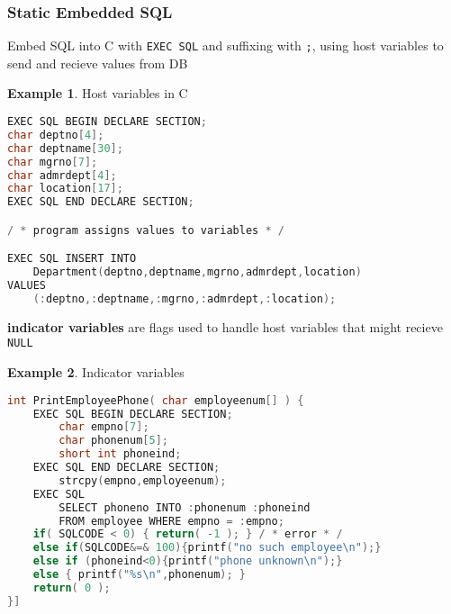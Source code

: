 \documentclass[]{article}
\theoremstyle{definition}
\newtheorem{ex}{Example}[section]
\begin{document}
			\subsubsection{Static Embedded SQL}		
				Embed SQL into C with \lstinline|EXEC SQL| and suffixing with \lstinline|;|, using host variables to send and recieve values from DB
				\begin{ex}
					Host variables in C
					\begin{lstlisting}[language=C]
EXEC SQL BEGIN DECLARE SECTION;
char deptno[4];
char deptname[30];
char mgrno[7];
char admrdept[4];
char location[17];
EXEC SQL END DECLARE SECTION;

/ * program assigns values to variables * /

EXEC SQL INSERT INTO
	Department(deptno,deptname,mgrno,admrdept,location)
VALUES
	(:deptno,:deptname,:mgrno,:admrdept,:location);
					\end{lstlisting}
				\end{ex}
				\textbf{indicator variables} are flags used to handle host variables that might recieve \lstinline|NULL|
				\begin{ex}
					Indicator variables
					\begin{lstlisting}[language=C]
int PrintEmployeePhone( char employeenum[] ) {
	EXEC SQL BEGIN DECLARE SECTION;
		char empno[7];
		char phonenum[5];
		short int phoneind;
	EXEC SQL END DECLARE SECTION;
		strcpy(empno,employeenum);
	EXEC SQL
		SELECT phoneno INTO :phonenum :phoneind
		FROM employee WHERE empno = :empno;
	if( SQLCODE < 0) { return( -1 ); } / * error * /
	else if(SQLCODE&=& 100){printf("no such employee\n");}
	else if (phoneind<0){printf("phone unknown\n");}
	else { printf("%s\n",phonenum); } 
	return( 0 );
}]
					\end{lstlisting}
				\end{ex}
\end{document}
